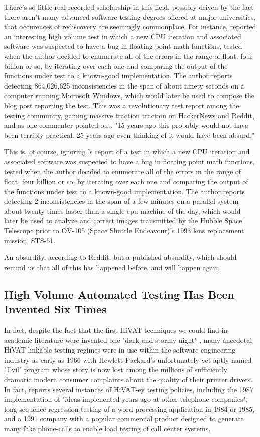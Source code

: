 There's so little real recorded scholarship in this field, possibly driven by the fact there aren't many advanced software testing degrees offered at major universities, that occurences of rediscovery are seemingly commonplace. For instance, \citet{dawsonFourBillion} reported an interesting high volume test in which a new CPU iteration and associated software was suspected to have a bug in floating point math functions, tested when the author decided to enumerate all of the errors in the range of float, four billion or so, by iterating over each one and comparing the output of the functions under test to a known-good implementation. The author reports detecting 864,026,625 inconsistencies in the span of about ninety seconds on a computer running Microsoft Windows, which would later be used to compose the blog post reporting the test. This was a revolutionary test report among the testing community, gaining massive traction traction on HackerNews and Reddit, and as one commenter pointed out, "15 years ago this probably would not have been terribly practical. 25 years ago even thinking of it would have been absurd."

This is, of course, ignoring \citet{hoffman2003Exhausting}'s report of a test in which a new CPU iteration and associated software was suspected to have a bug in floating point math functions, tested when the author decided to enumerate all of the errors in the range of float, four billion or so, by iterating over each one and comparing the output of the functions under test to a known-good implementation. The author reports detecting 2 inconsistencies in the span of a few minutes on a parallel system about twenty times faster than a single-cpu machine of the day, which would later be used to analyze and correct images transmitted by the Hubble Space Telescope prior to OV-105 (Space Shuttle Endeavour)'s 1993 lens replacement mission, STS-61.

An absurdity, according to Reddit, but a published absurdity, which should remind us that all of this has happened before, and will happen again.

\subsection{High Volume Automated Testing Has Been Invented Six Times}
In fact, despite the fact that the first HiVAT techniques we could find in academic literature were invented one "dark and stormy night" \citep{miller1989TR830}, many anecdotal HiVAT-linkable testing regimes were in use within the software engineering industry as early as 1966 with Hewlett-Packard's unfortunately-yet-aptly named "Evil" program whose story is now lost among the millions of sufficiently dramatic modern consumer complaints about the quality of their printer drivers. In fact, \citet{KanerHivatOverview} reports several instances of HiVAT-ey testing policies, including the 1987 implementation of "ideas implenented years ago at other telephone companies", long-sequence regression testing of a word-processing application in 1984 or 1985, and a 1991 company with a popular commercial product designed to generate many fake phone-calls to enable load testing of call center systems.

